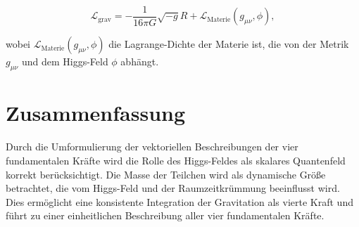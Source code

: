 \documentclass{article}
\begin{document}
	\begin{equation}
		\mathcal{L}_\text{grav} = -\frac{1}{16\pi G} \sqrt{-g}R + \mathcal{L}_\text{Materie}(g_{\mu\nu}, \phi),
	\end{equation}
	
	wobei $\mathcal{L}_\text{Materie}(g_{\mu\nu}, \phi)$ die Lagrange-Dichte der Materie ist, die von der Metrik $g_{\mu\nu}$ und dem Higgs-Feld $\phi$ abhängt.
	
	\section{Zusammenfassung}
	
	Durch die Umformulierung der vektoriellen Beschreibungen der vier fundamentalen Kräfte wird die Rolle des Higgs-Feldes als skalares Quantenfeld korrekt berücksichtigt. Die Masse der Teilchen wird als dynamische Größe betrachtet, die vom Higgs-Feld und der Raumzeitkrümmung beeinflusst wird. Dies ermöglicht eine konsistente Integration der Gravitation als vierte Kraft und führt zu einer einheitlichen Beschreibung aller vier fundamentalen Kräfte.
	
\end{document}
